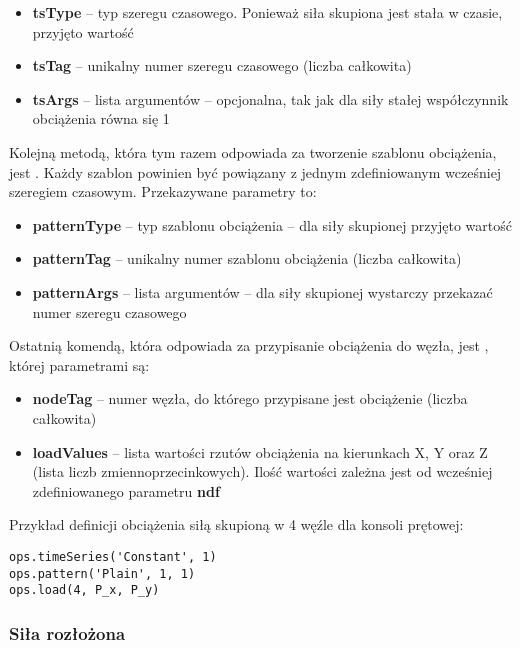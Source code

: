 \begin{itemize}
    \item \textbf{tsType} – typ szeregu czasowego. Ponieważ siła skupiona jest stała w czasie, przyjęto wartość 
    \item \textbf{tsTag} – unikalny numer szeregu czasowego (liczba całkowita)
    \item \textbf{tsArgs} – lista argumentów – opcjonalna, tak jak dla siły stałej współczynnik obciążenia równa się 1
\end{itemize}

Kolejną metodą, która tym razem odpowiada za tworzenie szablonu obciążenia, jest .
Każdy szablon powinien być powiązany z jednym zdefiniowanym wcześniej szeregiem czasowym.
Przekazywane parametry to:

\begin{itemize}
    \item \textbf{patternType} – typ szablonu obciążenia – dla siły skupionej przyjęto wartość 
    \item \textbf{patternTag} – unikalny numer szablonu obciążenia (liczba całkowita)
    \item \textbf{patternArgs} – lista argumentów – dla siły skupionej wystarczy przekazać numer szeregu czasowego
\end{itemize}

Ostatnią komendą, która odpowiada za przypisanie obciążenia do węzła, jest ,
której parametrami są:

\begin{itemize}
    \item \textbf{nodeTag} – numer węzła, do którego przypisane jest obciążenie (liczba całkowita)
    \item \textbf{loadValues} – lista wartości rzutów obciążenia na kierunkach X, Y oraz Z (lista liczb zmiennoprzecinkowych). Ilość wartości zależna jest od wcześniej zdefiniowanego parametru \textbf{ndf}
\end{itemize}

Przykład definicji obciążenia siłą skupioną w 4 węźle dla konsoli prętowej:
\begin{lstlisting}
ops.timeSeries('Constant', 1)
ops.pattern('Plain', 1, 1)
ops.load(4, P_x, P_y)
\end{lstlisting}

\subsubsection*{Siła rozłożona}

